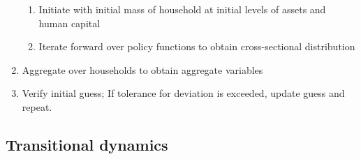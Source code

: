 \begin{enumerate}
        \begin{enumerate}
            \item Initiate with initial mass of household at initial levels of assets and human capital
            \item Iterate forward over policy functions to obtain cross-sectional distribution
        \end{enumerate}
    \item Aggregate over households to obtain aggregate variables
    \item Verify initial guess; If tolerance for deviation is exceeded, update guess and repeat.
\end{enumerate}

\subsection{Transitional dynamics}

